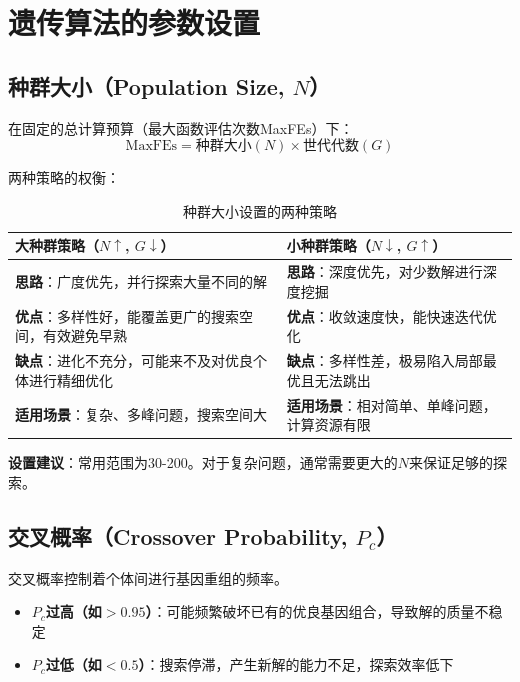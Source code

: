 \section{遗传算法的参数设置}

\subsection{种群大小（Population Size, $N$）}

在固定的总计算预算（最大函数评估次数MaxFEs）下：
\[
\text{MaxFEs} = \text{种群大小}(N) \times \text{世代代数}(G)
\]

两种策略的权衡：

\begin{table}[H]
\centering
\caption{种群大小设置的两种策略}
\begin{tabular}{p{}p{}}
\toprule
\textbf{大种群策略（$N \uparrow$, $G \downarrow$）} & \textbf{小种群策略（$N \downarrow$, $G \uparrow$）} \\
\midrule
\textbf{思路}：广度优先，并行探索大量不同的解 & \textbf{思路}：深度优先，对少数解进行深度挖掘 \\
\hline
\textbf{优点}：多样性好，能覆盖更广的搜索空间，有效避免早熟 & \textbf{优点}：收敛速度快，能快速迭代优化 \\
\hline
\textbf{缺点}：进化不充分，可能来不及对优良个体进行精细优化 & \textbf{缺点}：多样性差，极易陷入局部最优且无法跳出 \\
\hline
\textbf{适用场景}：复杂、多峰问题，搜索空间大 & \textbf{适用场景}：相对简单、单峰问题，计算资源有限 \\
\bottomrule
\end{tabular}
\end{table}

\textbf{设置建议}：常用范围为30-200。对于复杂问题，通常需要更大的$N$来保证足够的探索。

\subsection{交叉概率（Crossover Probability, $P_c$）}

交叉概率控制着个体间进行基因重组的频率。

\begin{itemize}
    \item \textbf{$P_c$过高（如$>0.95$）}：可能频繁破坏已有的优良基因组合，导致解的质量不稳定
    \item \textbf{$P_c$过低（如$<0.5$）}：搜索停滞，产生新解的能力不足，探索效率低下
\end{itemize}

